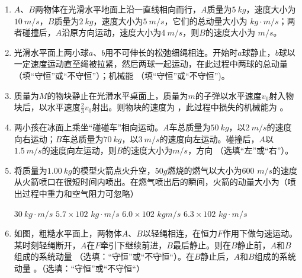 


\begin{enumerate}[leftmargin=0em]
\renewcommand{\labelenumi}{\arabic{enumi}.}
\item
{}
$ A $、$ B $两物体在光滑水平地面上沿一直线相向而行，$ A $质量为$ 5 \ kg $，速度大小为$ 10 \ m/s $，$ B $质量为$ 2 \ kg $，速度大小为$ 5 \ m/s $，它们的总动量大小为  $ kg \cdot m/s $；两者碰撞后，$ A $沿原方向运动，速度大小为$ 4 \ m/s $，则$ B $的速度大小为  $ m/s $。

\item 
{}
光滑水平面上两小球$ a $、$ b $用不可伸长的松弛细绳相连。开始时$ a $球静止，$ b $球以一定速度运动直至绳被拉紧，然后两球一起运动，在此过程中两球的总动量  （填“守恒”或“不守恒”）；机械能  （填“守恒”或“不守恒”)。

\item 
{}
质量为$ M $的物块静止在光滑水平桌面上，质量为$ m $的子弹以水平速度$ v_{0} $射入物块后，以水平速度$ \frac{ 2 }{ 3 } v_{0} $射出。则物块的速度为  ，此过程中损失的机械能为  。


\item
{}
两小孩在冰面上乘坐“碰碰车”相向运动。$ A $车总质量为$ 50 \ kg $，以$ 2 \ m/s $的速度向右运动；$ B $车总质量为$ 70 \ kg $，以$ 3 \ m/s $的速度向左运动。碰撞后，$ A $以$ 1.5 \ m/s $的速度向左运动，则$ B $的速度大小为$ m/s $，方向 （选填“左”或“右”）。

\item 
{}
将质量为$ 1.00 \ kg $的模型火箭点火升空，$ 50g $燃烧的燃气以大小为$ 600 $ $ m/s $的速度从火箭喷口在很短时间内喷出。在燃气喷出后的瞬间，火箭的动量大小为（喷出过程中重力和空气阻力可忽略）  

\fourchoices
{$ 30 \ kg \cdot m/s $ }
{$ 5.7 \times 102 $ $ kg \cdot m/s $}
{$ 6.0 \times 102 $ $ kg m/s $ }
{$ 6.3 \times 102 $ $ kg \cdot m/s $}

\item 
{}
如图，粗糙水平面上，两物体$ A $、$ B $以轻绳相连，在恒力$ F $作用下做匀速运动。某时刻轻绳断开，$ A $在$ F $牵引下继续前进，$ B $最后静止。则在$ B $静止前，$ A $和$ B $组成的系统动量 （选填：“守恒”或“不守恒“）。在$ B $静止后，$ A $和$ B $组成的系统动量  。（选填：“守恒”或“不守恒“）
\begin{figure}[h!]
\centering

\end{figure}




\end{enumerate}
